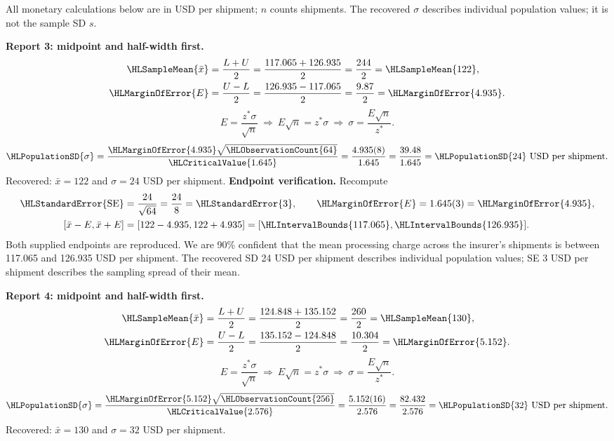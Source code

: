 All monetary calculations below are in USD per shipment; $n$ counts shipments. The recovered $\sigma$ describes individual population values; it is not the sample SD $s$.
\par\noindent\textbf{Report 3: midpoint and half-width first.}
\[\begin{aligned}
\HLSampleMean{\bar x}&=\frac{L+U}{2}=\frac{117.065+126.935}{2}=\frac{244}{2}=\HLSampleMean{122},\\
\HLMarginOfError{E}&=\frac{U-L}{2}=\frac{126.935-117.065}{2}=\frac{9.87}{2}=\HLMarginOfError{4.935}.
\end{aligned}\]
\[E=\frac{z^*\sigma}{\sqrt n}\ \Longrightarrow\ E\sqrt n=z^*\sigma\ \Longrightarrow\ \sigma=\frac{E\sqrt n}{z^*}.\]
\[\HLPopulationSD{\sigma}=\frac{\HLMarginOfError{4.935}\sqrt{\HLObservationCount{64}}}{\HLCriticalValue{1.645}}=\frac{4.935(8)}{1.645}=\frac{39.48}{1.645}=\HLPopulationSD{24}\text{ USD per shipment}.\]
Recovered: $\bar x=122$ and $\sigma=24$ USD per shipment.
\textbf{Endpoint verification.} Recompute
\[\begin{aligned}
\HLStandardError{\mathrm{SE}}&=\frac{24}{\sqrt{64}}=\frac{24}{8}=\HLStandardError{3},\qquad \HLMarginOfError{E}=1.645(3)=\HLMarginOfError{4.935},\\
[\bar x-E,\bar x+E]&=[122-4.935,122+4.935]=[\HLIntervalBounds{117.065},\HLIntervalBounds{126.935}].
\end{aligned}\]
Both supplied endpoints are reproduced. We are 90\% confident that the mean processing charge across the insurer's shipments is between 117.065 and 126.935 USD per shipment.
The recovered SD 24 USD per shipment describes individual population values; SE 3 USD per shipment describes the sampling spread of their mean.
\par\noindent\textbf{Report 4: midpoint and half-width first.}
\[\begin{aligned}
\HLSampleMean{\bar x}&=\frac{L+U}{2}=\frac{124.848+135.152}{2}=\frac{260}{2}=\HLSampleMean{130},\\
\HLMarginOfError{E}&=\frac{U-L}{2}=\frac{135.152-124.848}{2}=\frac{10.304}{2}=\HLMarginOfError{5.152}.
\end{aligned}\]
\[E=\frac{z^*\sigma}{\sqrt n}\ \Longrightarrow\ E\sqrt n=z^*\sigma\ \Longrightarrow\ \sigma=\frac{E\sqrt n}{z^*}.\]
\[\HLPopulationSD{\sigma}=\frac{\HLMarginOfError{5.152}\sqrt{\HLObservationCount{256}}}{\HLCriticalValue{2.576}}=\frac{5.152(16)}{2.576}=\frac{82.432}{2.576}=\HLPopulationSD{32}\text{ USD per shipment}.\]
Recovered: $\bar x=130$ and $\sigma=32$ USD per shipment.
